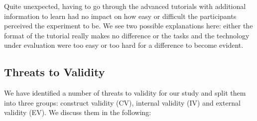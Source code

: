 Quite unexpected, having to go through the advanced tutorials with additional information to learn had no impact on how easy or difficult the participants perceived the experiment to be. We see two possible explanations here: either the format of the tutorial really makes no difference or the tasks and the technology under evaluation were too easy or too hard for a difference to become evident. 



\subsection{Threats to Validity}

We have identified a number of threats to validity for our study and split them into three groups: construct validity (CV), internal validity (IV) and external validity (EV). We discuss them in the following:

